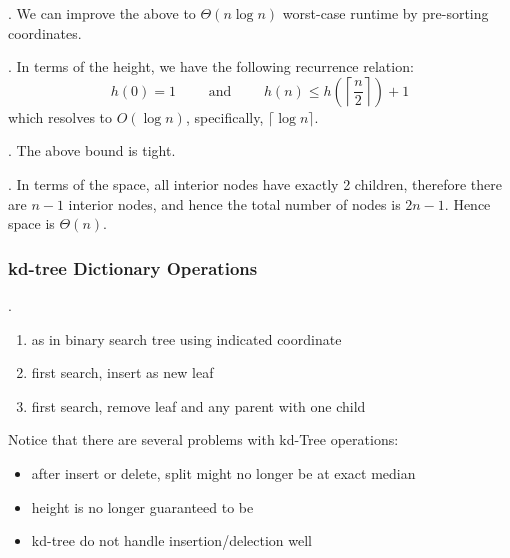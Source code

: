 \documentclass{article}
\begin{document}
\begin{comm}[].
    We can improve the above to $\Theta(n \log n)$ worst-case runtime by pre-sorting coordinates. 
\end{comm}

\begin{thmm}[].
    In terms of the height, we have the following recurrence relation: 
    \[ h(0) = 1 \qquad \text{ and } \qquad h(n) \leq h \left( \left\lceil \frac{n}{2} \right\rceil \right) + 1 \]
    which resolves to $O(\log n)$, specifically, $\lceil \log n \rceil$. 
\end{thmm}

\begin{comm}[].
    The above bound is tight. 
\end{comm}

\begin{thmm}[].
    In terms of the space, all interior nodes have exactly 2 children, therefore there are $n-1$ interior nodes, and hence the total number of nodes is $2n - 1$. Hence space is $\Theta(n)$. 
\end{thmm}

\subsubsection{kd-tree Dictionary Operations} 

\begin{codes}[].
    \begin{enumerate}
        \item[\code{search}] as in binary search tree using indicated  coordinate 
        \item[\code{insert}] first search, insert as new leaf 
        \item[\code{delete}] first search, remove leaf and  any parent with one child
    \end{enumerate}
\end{codes}

\begin{Question}{}
    Notice that there are several problems with kd-Tree operations: 
    \begin{itemize}
        \item after insert or delete, split might no longer be at exact median 
        \item height is no longer guaranteed to be 
        \item kd-tree do not handle insertion/delection well
    \end{itemize}
\end{Question}
\end{document}
